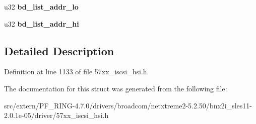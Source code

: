 \begin{DoxyCompactItemize}
\item 
\hypertarget{structbnx2i__nop__out__request_a513eb8b28d0712e4e0efd2a3b1c74565}{
u32 {\bfseries bd\_\-list\_\-addr\_\-lo}}
\label{structbnx2i__nop__out__request_a513eb8b28d0712e4e0efd2a3b1c74565}

\item 
\hypertarget{structbnx2i__nop__out__request_a02906bd5c89839350c778e539fc8aa49}{
u32 {\bfseries bd\_\-list\_\-addr\_\-hi}}
\label{structbnx2i__nop__out__request_a02906bd5c89839350c778e539fc8aa49}

\end{DoxyCompactItemize}


\subsection{Detailed Description}


Definition at line 1133 of file 57xx\_\-iscsi\_\-hsi.h.



The documentation for this struct was generated from the following file:\begin{DoxyCompactItemize}
\item 
src/extern/PF\_\-RING-\/4.7.0/drivers/broadcom/netxtreme2-\/5.2.50/bnx2i\_\-sles11-\/2.0.1e-\/05/driver/57xx\_\-iscsi\_\-hsi.h\end{DoxyCompactItemize}
